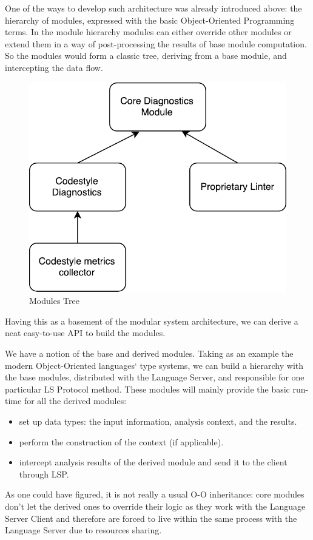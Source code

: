 One of the ways to develop such architecture was already introduced above: the hierarchy of modules, 
expressed with the basic Object-Oriented Programming terms. In the module hierarchy
modules can either override other modules or extend them in a way of post-processing the
results of base module computation. So the modules would form a classic tree, deriving from a base module,
and intercepting the data flow.

\begin{figure}[H]
    \centering
    \includegraphics[width=.5\textwidth]{figs/module_tree.pdf}
    \caption{Modules Tree}
\end{figure}

Having this as a basement of the modular system architecture, we can derive a 
neat easy-to-use API to build the modules.

We have a notion of the base and derived modules. Taking as an example the modern Object-Oriented languages` 
type systems, we can build a hierarchy with the base modules, distributed with the Language Server, and responsible for
one particular LS Protocol method. These modules will mainly provide the basic run-time for all the derived modules: 
\begin{itemize}
    \item set up data types: the input information, analysis context, and the results.  
    \item perform the construction of the context (if applicable).
    \item intercept analysis results of the derived module and send it to the client through LSP.
\end{itemize}

As one could have figured, it is not really a usual O-O inheritance: core modules don't let 
the derived ones to override their logic as they work with the Language Server Client and therefore
are forced to live within the same process with the Language Server due to resources sharing. 

